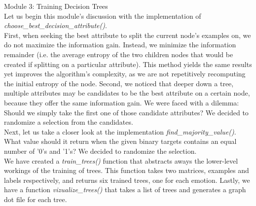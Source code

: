 Module 3: Training Decision Trees \\
Let us begin this module's discussion with the implementation of \emph{choose\_best\_decision\_attribute()}. \\
First, when seeking the best attribute to split the current node's examples on, we do not maximize the information gain.
Instead, we minimize the information remainder (i.e. the average entropy of the two children nodes
that would be created if splitting on a particular attribute).
This method yields the same results yet improves the algorithm's complexity,
as we are not repetitively recomputing the initial entropy of the node.
Second, we noticed that deeper down a tree, multiple attributes may be candidates to be the best attribute on a certain node,
because they offer the same information gain. We were faced with a dilemma: Should we simply
take the first one of those candidate attributes? We decided to randomize a selection from the candidates.\\
Next, let us take a closer look at the implementation \emph{find\_majority\_value()}.\\
What value should it return when the given binary targets contains an equal number of
'0's and '1's? We decided to randomize the selection.\\
We have created a \emph{train\_trees()} function that abstracts aways the lower-level workings of the training
of trees. This function takes two matrices, examples and labels respectively,
and returns six trained trees, one for each emotion.
Lastly, we have a function \emph{vizualize\_trees()} that takes a list of trees and generates a graph dot file
for each tree.

